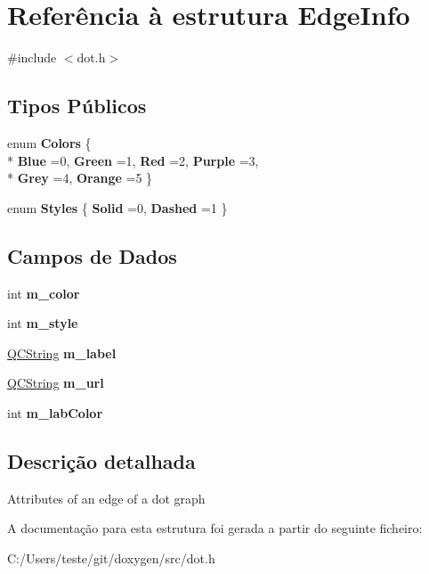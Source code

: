 \hypertarget{struct_edge_info}{\section{Referência à estrutura Edge\-Info}
\label{struct_edge_info}
}


{\ttfamily \#include $<$dot.\-h$>$}

\subsection*{Tipos Públicos}
\begin{DoxyCompactItemize}
\item 
enum {\bfseries Colors} \{ \\*
{\bfseries Blue} =0, 
{\bfseries Green} =1, 
{\bfseries Red} =2, 
{\bfseries Purple} =3, 
\\*
{\bfseries Grey} =4, 
{\bfseries Orange} =5
 \}
\item 
enum {\bfseries Styles} \{ {\bfseries Solid} =0, 
{\bfseries Dashed} =1
 \}
\end{DoxyCompactItemize}
\subsection*{Campos de Dados}
\begin{DoxyCompactItemize}
\item 
\hypertarget{struct_edge_info_a03e3e5b49fa92c6da19f81575466db57}{int {\bfseries m\-\_\-color}}\label{struct_edge_info_a03e3e5b49fa92c6da19f81575466db57}

\item 
\hypertarget{struct_edge_info_aef3058359d2aa854578485fe41004603}{int {\bfseries m\-\_\-style}}\label{struct_edge_info_aef3058359d2aa854578485fe41004603}

\item 
\hypertarget{struct_edge_info_a8b86da2954d4b434ff27bfea991c4e89}{\hyperlink{class_q_c_string}{Q\-C\-String} {\bfseries m\-\_\-label}}\label{struct_edge_info_a8b86da2954d4b434ff27bfea991c4e89}

\item 
\hypertarget{struct_edge_info_a4e37a33f6ef47405831f56b468059a3d}{\hyperlink{class_q_c_string}{Q\-C\-String} {\bfseries m\-\_\-url}}\label{struct_edge_info_a4e37a33f6ef47405831f56b468059a3d}

\item 
\hypertarget{struct_edge_info_a3f80efa9c1e4c6bbbadbe98f62a94cfc}{int {\bfseries m\-\_\-lab\-Color}}\label{struct_edge_info_a3f80efa9c1e4c6bbbadbe98f62a94cfc}

\end{DoxyCompactItemize}


\subsection{Descrição detalhada}
Attributes of an edge of a dot graph 

A documentação para esta estrutura foi gerada a partir do seguinte ficheiro\-:\begin{DoxyCompactItemize}
\item 
C\-:/\-Users/teste/git/doxygen/src/dot.\-h\end{DoxyCompactItemize}
